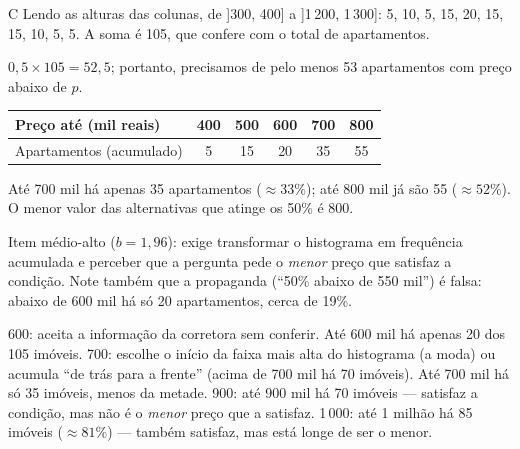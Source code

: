 \begin{resolucao}{C}
 Lendo as alturas das colunas, de ]300, 400] a ]1\,200, 1\,300]: 5, 10, 5, 15, 20, 15, 15, 10, 5, 5. A soma é 105, que confere com o total de apartamentos.

 $0{,}5\times105=52{,}5$; portanto, precisamos de pelo menos 53 apartamentos com preço abaixo de $p$.

\begin{center}\small
\begin{tabular}{lccccc}
\toprule
Preço até (mil reais) & 400 & 500 & 600 & 700 & 800\\
\midrule
Apartamentos (acumulado) & 5 & 15 & 20 & 35 & 55\\
\bottomrule
\end{tabular}
\end{center}
Até 700 mil há apenas 35 apartamentos ($\approx33\%$); até 800 mil já são 55 ($\approx52\%$). O menor valor das alternativas que atinge os 50\% é 800.


Item médio-alto ($b=1{,}96$): exige transformar o histograma em frequência acumulada e perceber que a pergunta pede o \emph{menor} preço que satisfaz a condição. Note também que a propaganda (“50\% abaixo de 550 mil”) é falsa: abaixo de 600 mil há só 20 apartamentos, cerca de 19\%.
\begin{distratores}
 600: aceita a informação da corretora sem conferir. Até 600 mil há apenas 20 dos 105 imóveis.
 700: escolhe o início da faixa mais alta do histograma (a moda) ou acumula “de trás para a frente” (acima de 700 mil há 70 imóveis). Até 700 mil há só 35 imóveis, menos da metade.
 900: até 900 mil há 70 imóveis — satisfaz a condição, mas não é o \emph{menor} preço que a satisfaz.
 1\,000: até 1 milhão há 85 imóveis ($\approx81\%$) — também satisfaz, mas está longe de ser o menor.
\end{distratores}
\end{resolucao}

